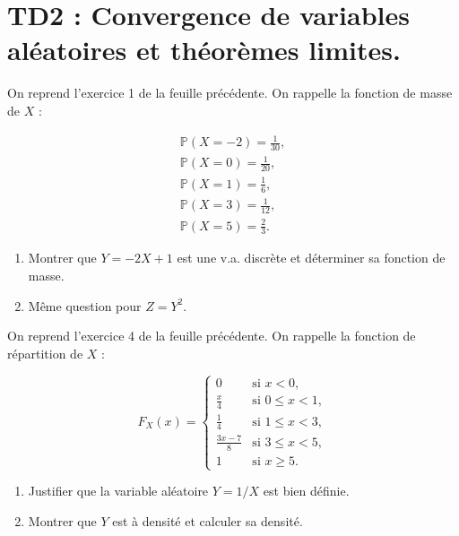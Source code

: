 \chapter*{TD2 : Convergence de variables aléatoires et théorèmes limites.}

\setcounter{exercice}{0}

\begin{mdframed}
\begin{exercice}
On reprend l'exercice 1 de la feuille précédente. On rappelle la fonction de masse de $X$ :

\begin{align*}
\mathbb{P}(X = -2) = \frac{1}{30}, \\
\mathbb{P}(X = 0) = \frac{1}{20}, \\
\mathbb{P}(X = 1) = \frac{1}{6}, \\ 
\mathbb{P}(X = 3) = \frac{1}{12}, \\ 
\mathbb{P}(X = 5) = \frac{2}{3}.
\end{align*}

\begin{enumerate}
\item Montrer que $Y = -2X + 1$ est une v.a. discrète et déterminer sa fonction de masse. 
\item Même question pour $Z = Y^2$.
\end{enumerate}
\end{exercice}
\end{mdframed}

\medskip

\begin{mdframed}
\begin{exercice}
On reprend l'exercice 4 de la feuille précédente. On rappelle la fonction de répartition de $X$ :

$$
F_X(x) = \begin{cases} 
0 & \text{si } x < 0, \\ 
\frac{x}{4} & \text{si } 0 \leqslant x < 1, \\ 
\frac{1}{4} & \text{si } 1 \leqslant x < 3, \\ 
\frac{3x-7}{8} & \text{si } 3 \leqslant x < 5, \\ 
1 & \text{si } x \geqslant 5. 
\end{cases}
$$

\begin{enumerate}
\item Justifier que la variable aléatoire $Y = 1/X$ est bien définie. 
\item Montrer que $Y$ est à densité et calculer sa densité.
\end{enumerate}
\end{exercice}
\end{mdframed}

